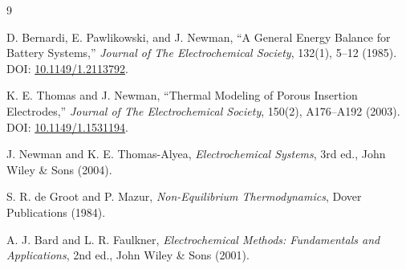 \documentclass[11pt,a4paper]{article}
\begin{document}
\begin{thebibliography}{9}

D. Bernardi, E. Pawlikowski, and J. Newman,
``A General Energy Balance for Battery Systems,''
\emph{Journal of The Electrochemical Society}, 132(1), 5--12 (1985).
DOI: \href{https://doi.org/10.1149/1.2113792}{10.1149/1.2113792}.

K. E. Thomas and J. Newman,
``Thermal Modeling of Porous Insertion Electrodes,''
\emph{Journal of The Electrochemical Society}, 150(2), A176--A192 (2003).
DOI: \href{https://doi.org/10.1149/1.1531194}{10.1149/1.1531194}.

J. Newman and K. E. Thomas-Alyea,
\emph{Electrochemical Systems}, 3rd ed.,
John Wiley \& Sons (2004).

S. R. de Groot and P. Mazur,
\emph{Non-Equilibrium Thermodynamics},
Dover Publications (1984).

A. J. Bard and L. R. Faulkner,
\emph{Electrochemical Methods: Fundamentals and Applications}, 2nd ed.,
John Wiley \& Sons (2001).

\end{thebibliography}
\end{document}

